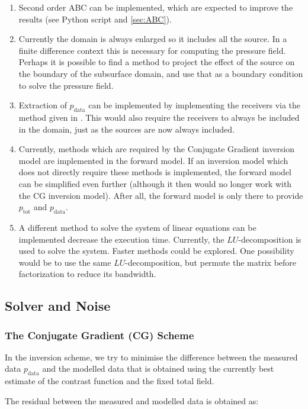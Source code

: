 \documentclass[10pt,a4paper]{article}
\begin{document}
\begin{enumerate}
	\item Second order ABC can be implemented, which are expected to improve the results (see Python script and \cref{sec:ABC}).
	\item Currently the domain is always enlarged so it includes all the source. In a finite difference context this is necessary for computing the pressure field. Perhaps it is possible to find a method to project the effect of the source on the boundary of the subsurface domain, and use that as a boundary condition to solve the pressure field.
	\item Extraction of $p_{\text{data}}$ can be implemented by implementing the receivers via the method given in \cite{Hicks}. This would also require the receivers to always be included in the domain, just as the sources are now always included.
	\item Currently, methods which are required by the Conjugate Gradient inversion model are implemented in the forward model. If an inversion model which does not directly require these methods is implemented, the forward model can be simplified even further (although it then would no longer work with the CG inversion model). After all, the forward model is only there to provide $p_{\text{tot}}$ and $p_{\text{data}}$.
	\item A different method to solve the system of linear equations can be implemented decrease the execution time. Currently, the $LU$-decomposition is used to solve the system. Faster methods could be explored. One possibility would be to use the same $LU$-decomposition, but permute the matrix before factorization to reduce its bandwidth.
\end{enumerate}


\subsection{Solver and Noise}
\label{CG_solver}
\subsubsection{The Conjugate Gradient (CG) Scheme}
\label{conjgrad}
In the inversion scheme, we try to minimise the difference between the
measured data $p_\text{data}$ and the modelled data that is obtained
using the currently best estimate of the contrast function and the
fixed total field.

The residual between the measured and modelled data is obtained as:
\end{document}
